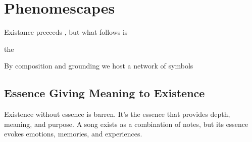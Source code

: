 \section{Phenomescapes}

Existance preceeds , but what follows is

the 

By composition and grounding we host a network of symbols





\subsection{Essence Giving Meaning to Existence}
Existence without essence is barren. It's the essence that provides depth, meaning, and purpose. A song exists as a combination of notes, but its essence evokes emotions, memories, and experiences.